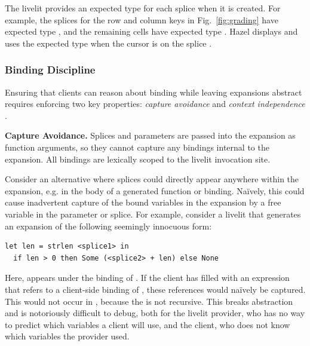 The livelit provides an expected type for each splice when it is created.
For example, the splices for the row and column keys in Fig.~\ref{fig:grading} have expected type ,
and the remaining cells have expected type .
Hazel displays and uses the expected type when the cursor is on the splice \cite{hazeltutor}.


\subsubsection{Binding Discipline}\label{sec:hygiene}


Ensuring that clients can reason about binding while leaving expansions
 abstract
 requires enforcing two key properties: \emph{capture avoidance}
and \emph{context independence} \cite{TLMs,adamsHygiene,DBLP:conf/popl/ClingerR91}.

\textbf{Capture Avoidance.}
Splices and parameters are passed into the expansion as function arguments, 
so they cannot capture any bindings internal to the expansion. All bindings 
are lexically scoped to the livelit invocation site.

Consider an alternative where 
splices could directly appear anywhere within the expansion, 
e.g. in the body of a generated function or  binding.
Na\"ively, this could cause inadvertent capture of the bound variables in the expansion by a free variable
in the parameter or splice. For example, consider a livelit that generates an expansion
of the following seemingly innocuous form:
\begin{lstlisting}[numbers=none]
  let len = strlen <splice1> in
  if len > 0 then Some (<splice2> + len) else None 
\end{lstlisting}
Here,  appears under the binding of . If the client has filled
 with an expression that refers to a client-side binding of ,
these references would na\"ively be captured. This would not occur in ,
because the  is not recursive.
This breaks abstraction and is notoriously difficult to debug,
both for the livelit provider, who has no way to predict which variables a client will use,
 and the client, who does not know which variables the provider used.

